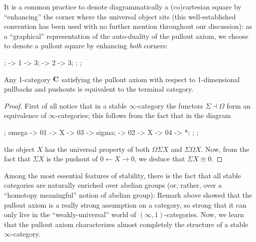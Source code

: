 \begin{notat}
It is a common practice to denote diagrammatically a (co)cartesian square by ``enhancing'' the corner where the universal object sits (this well\hyp{}established convention has been used with no further mention throughout our discussion): as a ``graphical'' representation of the auto\hyp{}duality of the pullout axiom, we choose to denote a pullout square by enhancing \emph{both} corners:
\begin{center}
\begin{kD}
;
 -> 1 -> 3;
 -> 2 -> 3;
;
;
\end{kD}
\end{center}
\end{notat}
\begin{remark}\label{pullout.is.genuinely.higher}
Any 1\hyp{}category $\mathbf{C}$ satisfying the pullout axiom with respect to 1-dimensional pullbacks and pushouts is equivalent to the terminal category.
\end{remark}
\begin{proof}
First of all notice that in a stable $\infty$\hyp{}category the functors $\Sigma\dashv \Omega$ form an equivalence of $\infty$\hyp{}categories; this follows from the fact that in the diagram
\begin{center}
\begin{kD}
;
\mor omega -> 01 -> X -> 03 -> sigma;
\mor * -> 02 -> X -> 04 -> *;
;
;
\end{kD}
\end{center}
the object $X$ has the universal property of both $\Omega\Sigma X$ and $\Sigma\Omega X$. Now, from the fact that $\Sigma X$ is the pushout of $0\leftarrow X\to 0$, we deduce that $\Sigma X\cong 0$.
\end{proof}
Among the most essential features of stability, there is the fact that all stable categories are naturally enriched over abelian groups (or, rather, over a ``homotopy meaningful'' notion of abelian group): Remark  above showed that the pullout axiom is a really strong assumption on a category, so strong that it can only live in the ``weakly\hyp{}universal'' world of $(\infty,1)$\hyp{}categories. Now, we learn that the pullout axiom characterizes almost completely the structure of a stable $\infty$\hyp{}category.
